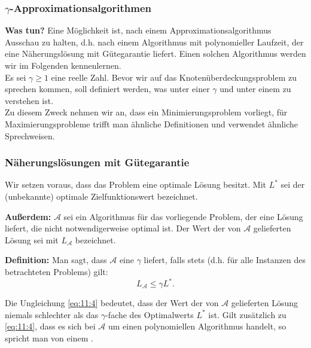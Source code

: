 \documentclass[smaller]{beamer}
\begin{document}
\begin{frame}
\frametitle{$\gamma$-Approximationsalgorithmen}
\textbf{Was tun?} Eine Möglichkeit ist, nach einem \alert{Approximationsalgorithmus} Ausschau zu halten, d.h. nach einem Algorithmus mit polynomieller Laufzeit, der eine \alert{Näherungslösung mit Gütegarantie} liefert. Einen solchen Algorithmus werden wir im Folgenden kennenlernen. \\ \vspace*{0.2cm}
Es sei $\gamma \geq 1$ eine reelle Zahl. Bevor wir auf das Knotenüberdeckungsproblem zu sprechen kommen, soll definiert werden, was unter einer  $\gamma$ und unter einem  zu verstehen ist. \\ \vspace*{0.2cm}
Zu diesem Zweck nehmen wir an, dass ein \alert{Minimierungsproblem} vorliegt, für Maximierungsprobleme trifft man ähnliche Definitionen und verwendet ähnliche Sprechweisen.
\end{frame}

\begin{frame}
\frametitle{Näherungslösungen mit Gütegarantie}
Wir setzen voraus, dass das Problem eine optimale Lösung besitzt. \alert{Mit $L^*$ sei der (unbekannte) optimale Zielfunktionswert bezeichnet}. \\ \vspace*{0.2cm} 

\textbf{Außerdem:} $\mathcal{A}$ sei ein Algorithmus für das vorliegende Problem, der eine Lösung liefert, die nicht notwendigerweise optimal ist. \alert{Der Wert der von $\mathcal{A}$ gelieferten Lösung sei mit $L_{\mathcal{A}}$ bezeichnet}. \\ \vspace*{0.2cm}

\textbf{Definition:} Man sagt, dass $\mathcal{A}$ eine  $\gamma$ liefert, falls stets (d.h. für alle Instanzen des betrachteten Problems) gilt:
\begin{equation}
\label{eq:11:4}
L_{\mathcal{A}} \leq \gamma L^*.
\end{equation}

Die Ungleichung \eqref{eq:11:4} bedeutet, dass der Wert der von $\mathcal{A}$ gelieferten Lösung niemals schlechter als das $\gamma$-fache des Optimalwerts $L^*$ ist. Gilt zusätzlich zu \eqref{eq:11:4}, dass es sich bei $\mathcal{A}$ um einen polynomiellen Algorithmus handelt, so spricht man von einem .
\end{frame}
\end{document}

